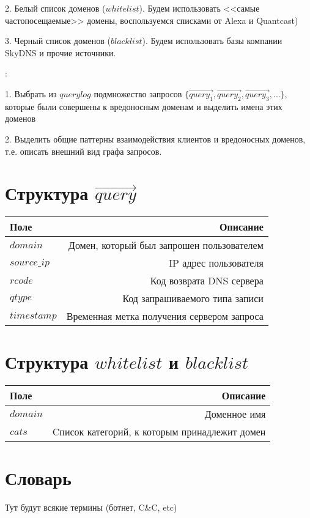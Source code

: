 \documentclass[14pt]{extreport}
\begin{document}
		2. Белый список доменов ($whitelist$). Будем использовать <<самые частопосещаемые>> домены, воспользуемся списками от Alexa и Quantcast)
		
		3. Черный список доменов ($blacklist$). Будем использовать базы компании SkyDNS и прочие источники.
	
	{:} 
	
	1. Выбрать из $querylog$ подмножество 
	запросов $\{\vec{query_1}, \vec{query_2}, \vec{query_3}, \dots\}$, которые были совершены к вредоносным доменам и выделить имена этих доменов
	
	2. Выделить общие паттерны взаимодействия клиентов и вредоносных доменов, т.е. описать внешний вид графа запросов.
	
	\section{Структура $\vec{query}$}
		\begin{tabular}{| l | r |}
			\hline
			Поле & Описание \\ \hline
			$domain$ & Домен, который был запрошен пользователем \\ \hline 
			$source\_ip$ &  IP адрес пользователя \\ \hline
			$rcode$ &  Код возврата DNS сервера \\ \hline
			$qtype$ &  Код запрашиваемого типа записи \\ \hline
			$timestamp$ &  Временная метка получения сервером запроса \\ \hline

		\end{tabular}
		
	
	\section{Структура $whitelist$ и $blacklist$}
	\begin{tabular}{| l | r |}
			\hline
			Поле & Описание \\ \hline
			$domain$ & Доменное имя \\ \hline 
			$cats$ & Cписок категорий, к которым принадлежит домен \\ \hline

	\end{tabular}
	\section{Словарь}
	Тут будут всякие термины (ботнет, C\&C, etc)
\end{document}
